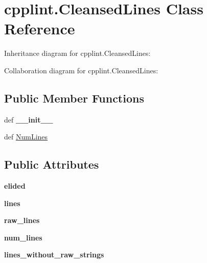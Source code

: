 \hypertarget{classcpplint_1_1CleansedLines}{\section{cpplint.\+Cleansed\+Lines Class Reference}
\label{classcpplint_1_1CleansedLines}
}


Inheritance diagram for cpplint.\+Cleansed\+Lines\+:


Collaboration diagram for cpplint.\+Cleansed\+Lines\+:
\subsection*{Public Member Functions}
\begin{DoxyCompactItemize}
\item 
\hypertarget{classcpplint_1_1CleansedLines_a5be47afab0f6c15b446e3e8cba657266}{def {\bfseries \+\_\+\+\_\+init\+\_\+\+\_\+}}\label{classcpplint_1_1CleansedLines_a5be47afab0f6c15b446e3e8cba657266}

\item 
def \hyperlink{classcpplint_1_1CleansedLines_a768a3024ce576777a996121053404edd}{Num\+Lines}
\end{DoxyCompactItemize}
\subsection*{Public Attributes}
\begin{DoxyCompactItemize}
\item 
\hypertarget{classcpplint_1_1CleansedLines_aa4d0a4d5081675c01656a5d86d99e8bd}{{\bfseries elided}}\label{classcpplint_1_1CleansedLines_aa4d0a4d5081675c01656a5d86d99e8bd}

\item 
\hypertarget{classcpplint_1_1CleansedLines_a9cd74bd010da1610a46322d6821bd06a}{{\bfseries lines}}\label{classcpplint_1_1CleansedLines_a9cd74bd010da1610a46322d6821bd06a}

\item 
\hypertarget{classcpplint_1_1CleansedLines_a9e94ce9e4f682be33c04fe82429c4dfd}{{\bfseries raw\+\_\+lines}}\label{classcpplint_1_1CleansedLines_a9e94ce9e4f682be33c04fe82429c4dfd}

\item 
\hypertarget{classcpplint_1_1CleansedLines_a4b42ab48659954fb6e0a4e4eb483a45a}{{\bfseries num\+\_\+lines}}\label{classcpplint_1_1CleansedLines_a4b42ab48659954fb6e0a4e4eb483a45a}

\item 
\hypertarget{classcpplint_1_1CleansedLines_a0cc228ba3c00ba590b27a759cf8023ce}{{\bfseries lines\+\_\+without\+\_\+raw\+\_\+strings}}\label{classcpplint_1_1CleansedLines_a0cc228ba3c00ba590b27a759cf8023ce}

\end{DoxyCompactItemize}


